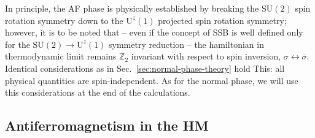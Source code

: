 In principle, the AF phase is physically established by breaking the $\mathrm{SU}(2)$ spin rotation symmetry down to the $\mathrm{U}^z(1)$ projected spin rotation symmetry; however, it is to be noted that -- even if the concept of SSB is well defined only for the $\mathrm{SU}(2) \to \mathrm{U}^z(1)$ symmetry reduction -- the hamiltonian in thermodynamic limit remains $\mathbb{Z}_2$ invariant with respect to spin inversion, $\sigma \leftrightarrow \overline{\sigma}$. Identical considerations as in Sec.~\ref{sec:normal-phase-theory} hold This: all physical quantities are spin-independent. As for the normal phase, we will use this considerations at the end of the calculations.

\subsection{Antiferromagnetism in the HM}\label{subsec:af-hm}

